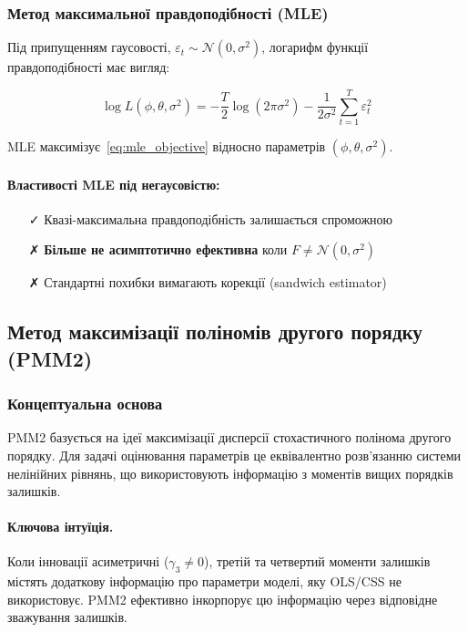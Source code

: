 \subsubsection{Метод максимальної правдоподібності (MLE)}
\label{subsubsec:mle}

Під припущенням гаусовості, $\varepsilon_t \sim \mathcal{N}(0,\sigma^2)$, логарифм функції правдоподібності має вигляд:

\begin{equation}
\label{eq:mle_objective}
\log L(\phi,\theta,\sigma^2) = -\frac{T}{2}\log(2\pi\sigma^2) - \frac{1}{2\sigma^2}\sum_{t=1}^{T} \varepsilon_t^2
\end{equation}

MLE максимізує~\eqref{eq:mle_objective} відносно параметрів $(\phi,\theta,\sigma^2)$.

\paragraph{Властивості MLE під негаусовістю:}
\begin{itemize}
    \item[✓] Квазі-максимальна правдоподібність залишається спроможною
    \item[✗] \textbf{Більше не асимптотично ефективна} коли $F \neq \mathcal{N}(0,\sigma^2)$
    \item[✗] Стандартні похибки вимагають корекції (sandwich estimator)
\end{itemize}

\subsection{Метод максимізації поліномів другого порядку (PMM2)}
\label{subsec:pmm2_method}

\subsubsection{Концептуальна основа}
\label{subsubsec:pmm2_conceptual}

PMM2 базується на ідеї максимізації дисперсії стохастичного полінома другого порядку. Для задачі оцінювання параметрів це еквівалентно розв'язанню системи нелінійних рівнянь, що використовують інформацію з моментів вищих порядків залишків.

\paragraph{Ключова інтуїція.} Коли інновації асиметричні ($\gamma_3 \neq 0$), третій та четвертий моменти залишків містять додаткову інформацію про параметри моделі, яку OLS/CSS не використовує. PMM2 ефективно інкорпорує цю інформацію через відповідне зважування залишків.


